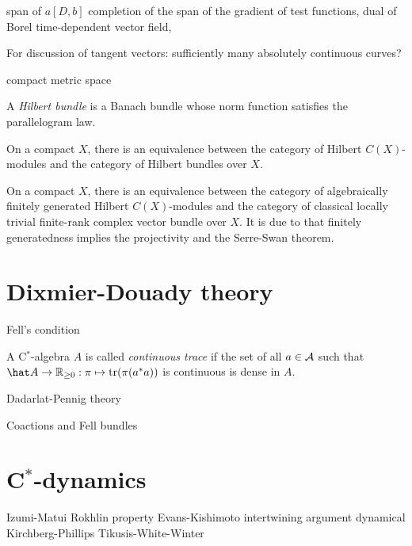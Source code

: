 \documentclass{../../large}
\begin{document}
\begin{prb}


\end{prb}




span of $a[D,b]$
completion of the span of the gradient of test functions,
dual of Borel time-dependent vector field,

For discussion of tangent vectors:
sufficiently many absolutely continuous curves?

compact metric space

\begin{prb}
A \emph{Hilbert bundle} is a Banach bundle whose norm function satisfies the parallelogram law.

\begin{parts}
\item On a compact $X$, there is an equivalence between the category of Hilbert $C(X)$-modules and the category of Hilbert bundles over $X$.
\item On a compact $X$, there is an equivalence between the category of algebraically finitely generated Hilbert $C(X)$-modules and the category of classical locally trivial finite-rank complex vector bundle over $X$.
It is due to that finitely generatedness implies the projectivity and the Serre-Swan theorem.
\end{parts}
\end{prb}



\section{Dixmier-Douady theory}


Fell's condition

A C$^*$-algebra $A$ is called \emph{continuous trace} if the set of all $a\in\mathcal{A}$ such that $\hat A\to\R_{\ge0}:\pi\mapsto\tr(\pi(a^*a))$ is continuous is dense in $A$.



Dadarlat-Pennig theory


Coactions and Fell bundles



\section{C$^*$-dynamics}

Izumi-Matui
Rokhlin property
Evans-Kishimoto intertwining argument
dynamical Kirchberg-Phillips
Tikusis-White-Winter
\end{document}

